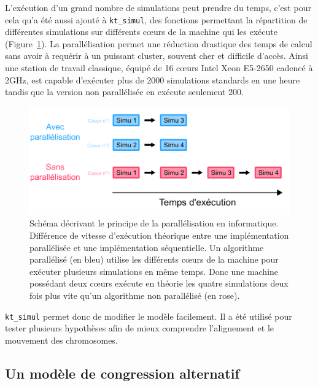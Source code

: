 \documentclass[12pt,a4paper,twoside,openright]{book}
\begin{document}
L'exécution d'un grand nombre de simulations peut prendre du temps,
c'est pour cela qu'a été aussi ajouté à \texttt{kt\_simul}, des
fonctions permettant la répartition de différentes simulations sur
différents cœurs de la machine qui les exécute
(Figure~\ref{fig:parallel}). La parallélisation permet une réduction
drastique des temps de calcul sans avoir à requérir à un puissant
cluster, souvent cher et difficile d'accès. Ainsi une station de travail
classique, équipé de 16 cœurs Intel Xeon E5-2650 cadencé à 2GHz, est
capable d'exécuter plus de 2000 simulations standards en une heure
tandis que la version non parallélisée en exécute seulement 200.

\begin{figure}[htbp]
\centering
\includegraphics{figures/results/modelling/parallel.png}
\caption[Schéma décrivant le principe de la parallélisation en informatique]{\label{fig:parallel}Schéma
décrivant le principe de la parallélisation en informatique. Différence
de vitesse d'exécution théorique entre une implémentation parallélisée
et une implémentation séquentielle. Un algorithme parallélisé (en bleu)
utilise les différents cœurs de la machine pour exécuter plusieurs
simulations en même temps. Donc une machine possédant deux cœurs exécute
en théorie les quatre simulations deux fois plus vite qu'un algorithme
non parallélisé (en rose).}
\end{figure}

\texttt{kt\_simul} permet donc de modifier le modèle facilement. Il a
été utilisé pour tester plusieurs hypothèses afin de mieux comprendre
l'alignement et le mouvement des chromosomes.

\subsection{Un modèle de congression
alternatif}\label{un-moduxe8le-de-congression-alternatif}

\label{sec:second-modele}
\end{document}
